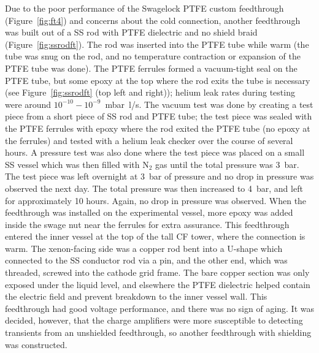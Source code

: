 Due to the poor performance of the Swagelock \ac{PTFE} custom feedthrough (Figure~\ref{fig:ft4}) and concerns about the cold connection, another feedthrough was built out of a \ac{SS} rod with \ac{PTFE} dielectric and no shield braid (Figure~\ref{fig:ssrodft}). The rod was inserted into the \ac{PTFE} tube while warm (the tube was snug on the rod, and no temperature contraction or expansion of the \ac{PTFE} tube was done). The \ac{PTFE} ferrules formed a vacuum-tight seal on the \ac{PTFE} tube, but some epoxy at the top where the rod exits the tube is necessary (see Figure~\ref{fig:ssrodft} (top left and right)); helium leak rates during testing were around $10^{-10} - 10^{-9}$~mbar~l/s. The vacuum test was done by creating a test piece from a short piece of \acs{SS} rod and \acs{PTFE} tube; the test piece was sealed with the \acs{PTFE} ferrules with epoxy where the rod exited the \acs{PTFE} tube (no epoxy at the ferrules) and tested with a helium leak checker over the course of several hours. A pressure test was also done where the test piece was placed on a small \acs{SS} vessel which was then filled with N$_{2}$ gas until the total pressure was 3~bar. The test piece was left overnight at 3~bar of pressure and no drop in pressure was observed the next day. The total pressure was then increased to 4~bar, and left for approximately 10 hours. Again, no drop in pressure was observed. When the feedthrough was installed on the experimental vessel, more epoxy was added inside the swage nut near the ferrules for extra assurance. This feedthrough entered the inner vessel at the top of the tall \ac{CF} tower, where the connection is warm. The xenon-facing side was a copper rod bent into a U-shape which connected to the \ac{SS} conductor rod via a pin, and the other end, which was threaded, screwed into the cathode grid frame. The bare copper section was only exposed under the liquid level, and elsewhere the \ac{PTFE} dielectric helped contain the electric field and prevent breakdown to the inner vessel wall. This feedthrough had good voltage performance, and there was no sign of aging. It was decided, however, that the charge amplifiers were more susceptible to detecting transients from an unshielded feedthrough, so another feedthrough with shielding was constructed. 


